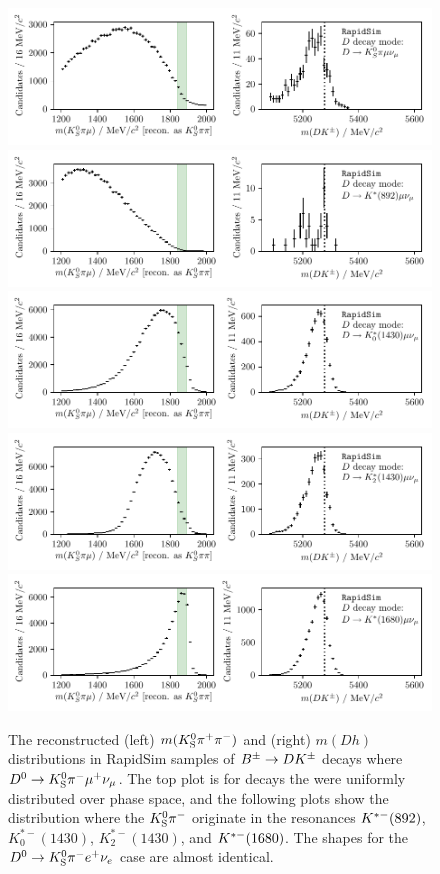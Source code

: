 \begin{figure}[tbp]
    \centering
    \includegraphics[width=0.8\columnwidth]{figures/analysis/background_checks/semilep_D_mu_PHSP.pdf}
    \includegraphics[width=0.8\columnwidth]{figures/analysis/background_checks/semilep_D_mu_892.pdf}
    \includegraphics[width=0.8\columnwidth]{figures/analysis/background_checks/semilep_D_mu_1430.pdf}
    \includegraphics[width=0.8\columnwidth]{figures/analysis/background_checks/semilep_D_mu_1430_2.pdf}
    \includegraphics[width=0.8\columnwidth]{figures/analysis/background_checks/semilep_D_mu_1680.pdf}
    \caption{The reconstructed (left) $m({{K}^0_{\mathrm{S}}} \pi^+ \pi^-)$ and (right) $m(Dh)$ distributions in RapidSim samples of ${{B}^\pm}\rightarrow{\ensuremath{D}} {\ensuremath{{K}^\pm}}$ decays where ${{D}^0}\rightarrow{\ensuremath{{K}^0_{\mathrm{S}}}}\pi^-\mu^+\nu_\mu$. The top plot is for  decays the were uniformly distributed over phase space, and the following plots show the distribution where the ${{K}^0_{\mathrm{S}}}{{\pi}^-}$ originate in the resonances ${{K}^{*-}}(892)$, $K^{*-}_0(1430)$, $K^{*-}_2(1430)$, and ${{K}^{*-}}(1680)$. The shapes for the ${{D}^0}\rightarrow{\ensuremath{{K}^0_{\mathrm{S}}}}\pi^-e^+\nu_e$ case are almost identical.}
    \label{fig:semileptonic_D_decays_kspp}
\end{figure}

